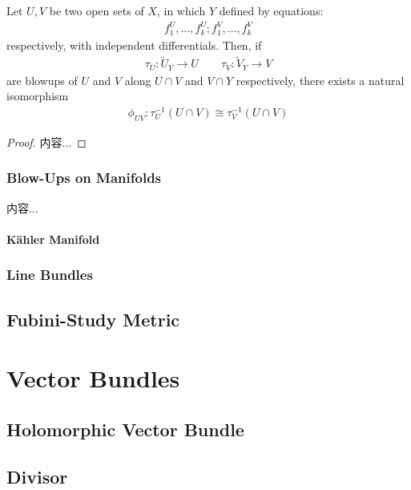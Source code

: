 \documentclass[Total.tex]{subfiles}
\begin{document}
			\begin{lemma}
				Let $U,V$ be two open sets of $X$, in which $Y$ defined by equations:
				\begin{gather*}
					f_1^U,\dots,f_k^U;f_1^V,\dots,f_k^V
				\end{gather*}
				respectively, with independent differentials. Then, if
				\begin{gather*}
					\tau_U:\tilde{U}_Y\rightarrow U\qquad \tau_V:\tilde{V}_Y\rightarrow V
				\end{gather*}
				are blowups of $U$ and $V$ along $U\cap V$ and $V\cap Y$ respectively, there exists a natural isomorphism
				\begin{gather*}
					\phi_{UV}:\tau_U^{-1}(U\cap V)\cong \tau_V^{-1}(U\cap V)
				\end{gather*}
			\end{lemma}
			\begin{proof}
				内容...
			\end{proof}
			\subsection{Blow-Ups on Manifolds}
				\begin{Def}
					内容...
				\end{Def}
				\subsubsection{K\"{a}hler Manifold}
			\subsection{Line Bundles}
		\section{Fubini-Study Metric}
	
		
	\chapter{Vector Bundles}
		\section{Holomorphic Vector Bundle}
		\section{Divisor}	
\end{document}
